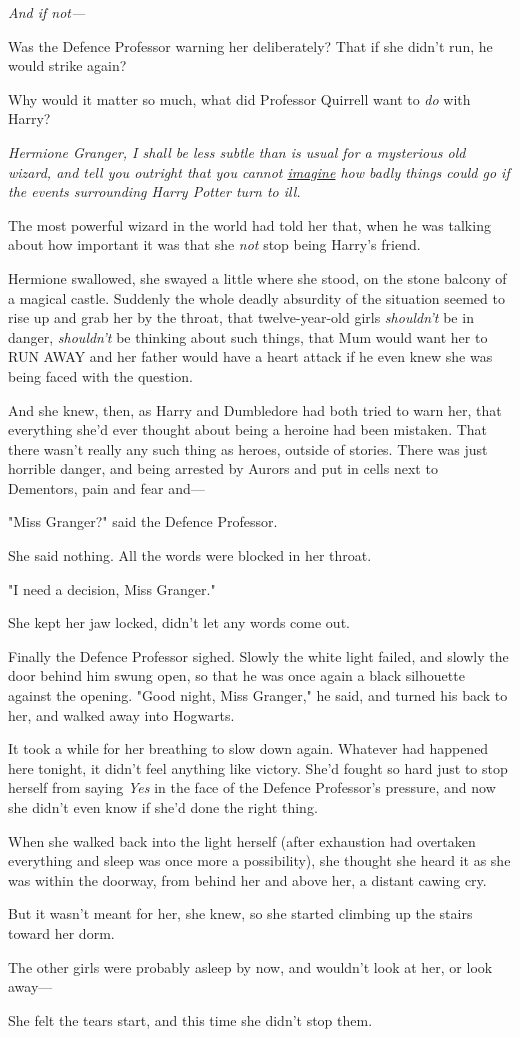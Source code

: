 \emph{And if not---}

Was the Defence Professor warning her deliberately? That if she didn't run, he
would strike again?

Why would it matter so much, what did Professor Quirrell want to \emph{do} with
Harry?

\emph{Hermione Granger, I shall be less subtle than is usual for a mysterious
old wizard, and tell you outright that you cannot \underline{imagine} how badly
things could go if the events surrounding Harry Potter turn to ill.}

The most powerful wizard in the world had told her that, when he was talking
about how important it was that she \emph{not} stop being Harry's friend.

Hermione swallowed, she swayed a little where she stood, on the stone balcony
of a magical castle. Suddenly the whole deadly absurdity of the situation
seemed to rise up and grab her by the throat, that twelve-year-old girls
\emph{shouldn't} be in danger, \emph{shouldn't} be thinking about such things,
that Mum would want her to RUN AWAY and her father would have a heart attack if
he even knew she was being faced with the question.

And she knew, then, as Harry and Dumbledore had both tried to warn her, that
everything she'd ever thought about being a heroine had been mistaken. That
there wasn't really any such thing as heroes, outside of stories. There was
just horrible danger, and being arrested by Aurors and put in cells next to
Dementors, pain and fear and---

"Miss Granger?" said the Defence Professor.

She said nothing. All the words were blocked in her throat.

"I need a decision, Miss Granger."

She kept her jaw locked, didn't let any words come out.

Finally the Defence Professor sighed. Slowly the white light failed, and slowly
the door behind him swung open, so that he was once again a black silhouette
against the opening. "Good night, Miss Granger," he said, and turned his back
to her, and walked away into Hogwarts.

It took a while for her breathing to slow down again. Whatever had happened
here tonight, it didn't feel anything like victory. She'd fought so hard just
to stop herself from saying \emph{Yes} in the face of the Defence Professor's
pressure, and now she didn't even know if she'd done the right thing.

When she walked back into the light herself (after exhaustion had overtaken
everything and sleep was once more a possibility), she thought she heard it as
she was within the doorway, from behind her and above her, a distant cawing cry.

But it wasn't meant for her, she knew, so she started climbing up the stairs
toward her dorm.

The other girls were probably asleep by now, and wouldn't look at her, or look
away---

She felt the tears start, and this time she didn't stop them.
